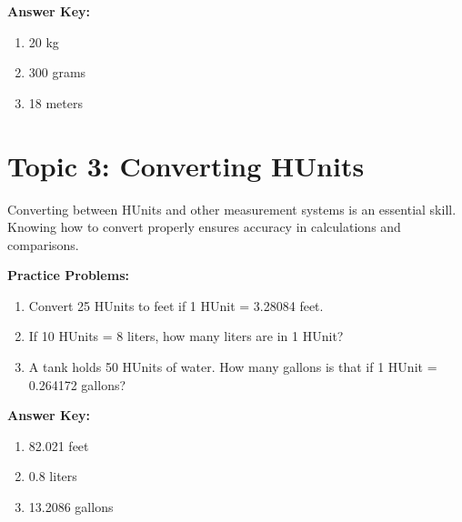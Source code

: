 \documentclass{article}
\begin{document}
\textbf{Answer Key:}
\begin{enumerate}[label=\arabic*.]
    \item 20 kg
    \item 300 grams
    \item 18 meters
\end{enumerate}

\section*{Topic 3: Converting HUnits}
Converting between HUnits and other measurement systems is an essential skill. Knowing how to convert properly ensures accuracy in calculations and comparisons.

\textbf{Practice Problems:}
\begin{enumerate}[label=\arabic*.]
    \item Convert 25 HUnits to feet if 1 HUnit = 3.28084 feet.
    \item If 10 HUnits = 8 liters, how many liters are in 1 HUnit?
    \item A tank holds 50 HUnits of water. How many gallons is that if 1 HUnit = 0.264172 gallons?
\end{enumerate}

\textbf{Answer Key:}
\begin{enumerate}[label=\arabic*.]
    \item 82.021 feet
    \item 0.8 liters
    \item 13.2086 gallons
\end{enumerate}
\end{document}
